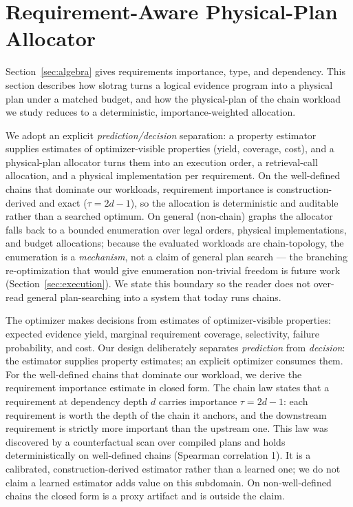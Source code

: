\section{Requirement-Aware Physical-Plan Allocator}
\label{sec:optimizer}

Section~\ref{sec:algebra} gives requirements importance, type, and dependency.
This section describes how slotrag turns a logical evidence program into a
physical plan under a matched budget, and how the physical-plan of the chain
workload we study reduces to a deterministic, importance-weighted allocation.

We adopt an explicit \emph{prediction/decision} separation: a property estimator
supplies estimates of optimizer-visible properties (yield, coverage, cost), and
a physical-plan allocator turns them into an execution order, a retrieval-call
allocation, and a physical implementation per requirement. On the well-defined
chains that dominate our workloads, requirement importance is
construction-derived and exact ($\tau = 2d - 1$), so the allocation is
deterministic and auditable rather than a searched optimum. On general
(non-chain) graphs the allocator falls back to a bounded enumeration over legal
orders, physical implementations, and budget allocations; because the evaluated
workloads are chain-topology, the enumeration is a \emph{mechanism}, not a claim
of general plan search --- the branching re-optimization that would give
enumeration non-trivial freedom is future work (Section~\ref{sec:execution}).
We state this boundary so the reader does not over-read general plan-searching
into a system that today runs chains.

The optimizer makes decisions from estimates of optimizer-visible properties:
expected evidence yield, marginal requirement coverage, selectivity, failure
probability, and cost. Our design deliberately separates \emph{prediction} from
\emph{decision}: the estimator supplies property estimates; an explicit
optimizer consumes them. For the well-defined chains that dominate our
workload, we derive the requirement importance estimate in closed form. The
chain law states that a requirement at dependency depth $d$ carries importance
$\tau = 2d - 1$: each requirement is worth the depth of the chain it anchors,
and the downstream requirement is strictly more important than the upstream
one. This law was discovered by a counterfactual scan over compiled plans and
holds deterministically on well-defined chains (Spearman correlation 1). It is
a calibrated, construction-derived estimator rather than a learned one; we do
not claim a learned estimator adds value on this subdomain. On
non-well-defined chains the closed form is a proxy artifact and is outside the
claim.

